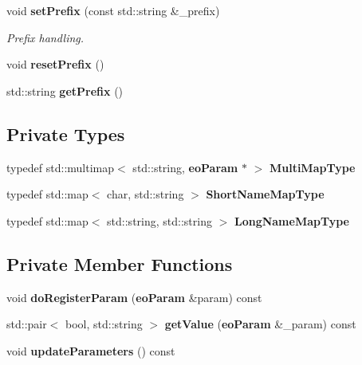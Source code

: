 \begin{CompactItemize}
\item 
void {\bf set\-Prefix} (const std::string \&\_\-prefix)\label{classeo_parser_a14}

\begin{CompactList}\small\item\em Prefix handling. \item\end{CompactList}\item 
void {\bf reset\-Prefix} ()\label{classeo_parser_a15}

\item 
std::string {\bf get\-Prefix} ()\label{classeo_parser_a16}

\end{CompactItemize}
\subsection*{Private Types}
\begin{CompactItemize}
\item 
typedef std::multimap$<$ std::string, {\bf eo\-Param} $\ast$ $>$ {\bf Multi\-Map\-Type}\label{classeo_parser_y0}

\item 
typedef std::map$<$ char, std::string $>$ {\bf Short\-Name\-Map\-Type}\label{classeo_parser_y1}

\item 
typedef std::map$<$ std::string, std::string $>$ {\bf Long\-Name\-Map\-Type}\label{classeo_parser_y2}

\end{CompactItemize}
\subsection*{Private Member Functions}
\begin{CompactItemize}
\item 
void {\bf do\-Register\-Param} ({\bf eo\-Param} \&param) const \label{classeo_parser_d0}

\item 
std::pair$<$ bool, std::string $>$ {\bf get\-Value} ({\bf eo\-Param} \&\_\-param) const \label{classeo_parser_d1}

\item 
void {\bf update\-Parameters} () const \label{classeo_parser_d2}

\end{CompactItemize}
